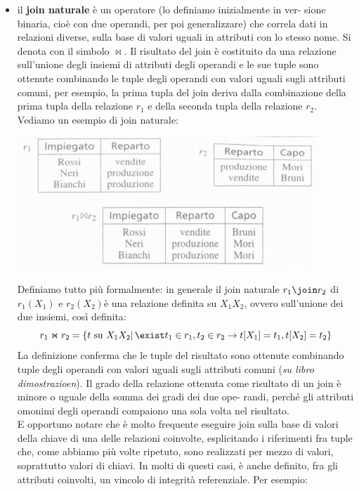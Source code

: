 \documentclass[a4paper,12pt, oneside]{book}
\begin{document}
\begin{itemize}
\item il \textbf{join naturale} è un operatore (lo definiamo inizialmente in ver-
sione binaria, cioè con due operandi, per poi generalizzare) che correla dati in
relazioni diverse, sulla base di valori uguali in attributi con lo stesso nome. Si denota con il simbolo $\Join$. Il risultato del join è costituito da una relazione
sull'unione degli insiemi di attributi degli operandi e le sue tuple sono ottenute
combinando le tuple degli operandi con valori uguali sugli attributi comuni, per esempio,
la prima tupla del join deriva dalla combinazione della prima tupla della relazione $r_1$ e della seconda tupla della relazione $r_2$.\\
Vediamo un esempio di join naturale:
\begin{center}
\includegraphics[scale=0.7]{img/alg10.png}
\end{center}
Definiamo tutto più formalmente: in generale il join naturale $r_1\join r_2$ di
$r_1(X_1)$ e $r_2(X_2)$è una relazione definita su $X_1X_2$, ovvero sull'unione dei due insiemi, così definita:
\[r_1\Join r_2=\{t \mbox{ su } X_1X_2|\, \exist t_1\in r_1, t_2\in r_2 \to t[X_1]=t_1, t[X_2]=t_2 \}\]
La definizione conferma che le tuple del risultato sono ottenute combinando tuple
degli operandi con valori uguali sugli attributi comuni (\textit{su libro dimostrazioen}). Il grado della relazione ottenuta
come risultato di un join è minore o uguale della somma dei gradi dei due ope-
randi, perché gli attributi omonimi degli operandi compaiono una sola volta nel
risultato.\\
E opportuno notare che è molto frequente eseguire join sulla base di valori
della chiave di una delle relazioni coinvolte, esplicitando i riferimenti fra tuple
che, come abbiamo più volte ripetuto, sono realizzati per mezzo di valori, soprattutto
valori di chiavi. In molti di questi casi, è anche definito, fra gli attributi coinvolti, un vincolo di integrità referenziale. Per esempio:
\begin{center}

\end{center}
\end{itemize}
\end{document}

